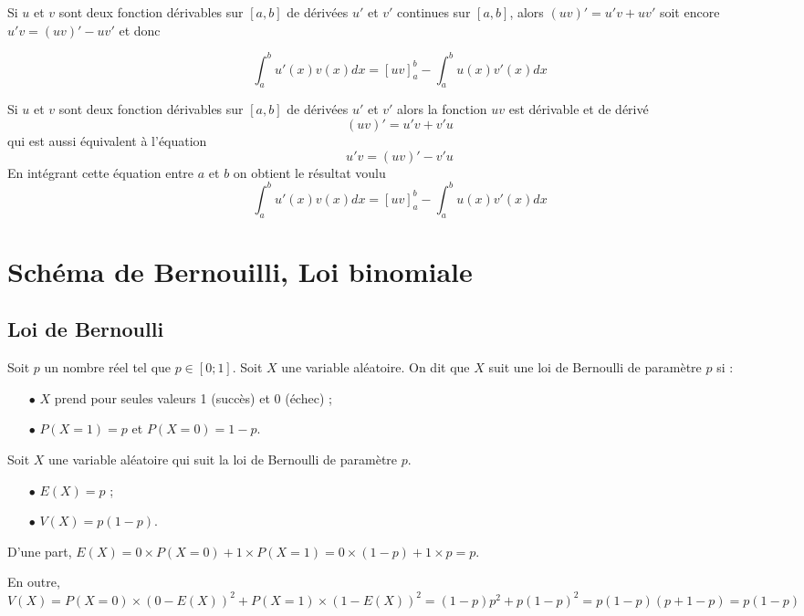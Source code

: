\documentclass[french]{book}
\newcommand{\ds}{\displaystyle}
\begin{document}
\begin{prop}
  Si $u$ et $v$ sont deux fonction dérivables sur $[a,b]$ de dérivées $u'$ et $v'$ continues sur $[a,b]$, alors $(uv)'=u'v+uv'$ soit encore $u'v=(uv)'-uv'$  et donc

$$ \ds\int_a^bu'(x)v(x)d x=[uv]_a^b-\int_a^bu(x)v'(x)d x $$
\end{prop}

\begin{demo}
 Si $u$ et $v$ sont deux fonction dérivables sur $[a,b]$ de dérivées $u'$ et $v'$ alors la fonction $uv$ est dérivable et de dérivé 
 $$(uv)'=u'v+v'u$$
 qui est aussi équivalent à  l'équation $$ u'v=(uv)'-v'u $$
En intégrant cette équation entre $a$ et $b$ on obtient le résultat voulu
$$ \ds\int_a^bu'(x)v(x)d x=[uv]_a^b-\int_a^bu(x)v'(x)d x $$
\end{demo}

\chapter{Schéma de Bernouilli, Loi binomiale}


\section{Loi de Bernoulli}


\begin{defn}
Soit $p$ un nombre réel tel que $p\in[0;1]$. Soit $X$ une variable aléatoire. On dit que $X$ suit une loi de Bernoulli de paramètre $p$ si :
\begin{itemize}
 \item[$\bullet$] $X$ prend pour seules valeurs 1 (\og{}succès\fg{}) et 0 (\og{}échec\fg{}) ;
\item[$\bullet$] $P(X=1)=p$ et $P(X=0)=1-p$.
\end{itemize}
\end{defn}


\begin{prop}
 Soit $X$ une variable aléatoire qui suit la loi de Bernoulli de paramètre $p$.
\begin{itemize}
 \item[$\bullet$] $E(X)=p$ ;
\item[$\bullet$] $V(X)=p(1-p)$.
\end{itemize}
\end{prop}


\begin{demo}
 D'une part, $E(X)=0\times P(X=0)+1\times P(X=1)=0\times (1-p)+1\times p = p$. \par
\noindent En outre, $V(X)=P(X=0)\times (0-E(X))^2+P(X=1)\times (1-E(X))^2=(1-p)p^2+p(1-p)^2=p(1-p)(p+1-p)=p(1-p)$
\end{demo}
\end{document}
